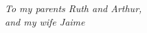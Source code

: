 \begin{dedication}
\null\vfil
\begin{center}
    \emph{
    To my parents Ruth and Arthur,\\
    and my wife Jaime
}
\end{center}
\vfil\null
\end{dedication}
